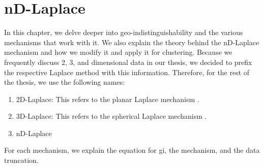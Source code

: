 \chapter{nD-Laplace}
In this chapter, we delve deeper into geo-indistinguishability and the various mechanisms that work with it.
We also explain the theory behind the nD-Laplace mechanism and how we modify it and apply it for clustering.
Because we frequently discuss 2, 3, and dimensional data in our thesis, we decided to prefix the respective Laplace method with this information.
Therefore, for the rest of the thesis, we use the following names:
\begin{enumerate}
  \item 2D-Laplace: This refers to the planar Laplace mechanism \citep{DBLP:journals/corr/abs-1212-1984}.
  \item 3D-Laplace: This refers to the spherical Laplace mechanism \citep{9646489}.
  \item nD-Laplace
\end{enumerate}
For each mechanism, we explain the equation for \gls{gi}, the mechanism, and the data truncation.



\newpage
